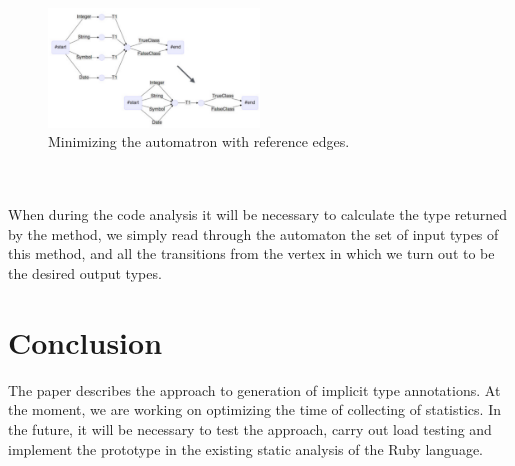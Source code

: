 \documentclass[conference]{IEEEtran}
\begin{document}
\begin{figure}[h]
    \centering
    \includegraphics[width=0.5\textwidth]{img5}
    \caption{Minimizing the automatron with reference edges.}
\end{figure}
\\
\\
When during the code analysis it will be necessary to calculate the type returned by the method, we simply read through the automaton the set of input types of this method, and all the transitions from the vertex in which we turn out to be the desired output types.
\section{Conclusion}
The paper describes the approach to generation of implicit type annotations. At the moment, we are working on optimizing the time of collecting of statistics. In the future, it will be necessary to test the approach, carry out load testing and implement the prototype in the existing static analysis of the Ruby language.



\end{document}
